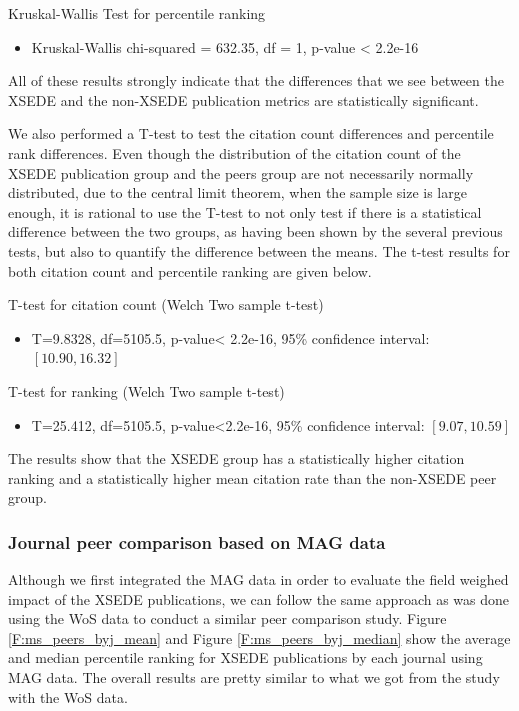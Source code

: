 \documentclass[sigconf]{acmart}
\begin{document}
Kruskal-Wallis Test for percentile ranking
\begin{itemize}
\item Kruskal-Wallis chi-squared = 632.35, df = 1, p-value < 2.2e-16
\end{itemize}

All of these results strongly indicate that the differences that we
see between the XSEDE and the non-XSEDE publication metrics are
statistically significant.

We also performed a T-test to test the citation count differences and
percentile rank differences. Even though the distribution of the
citation count of the XSEDE publication group and the peers group are
not necessarily normally distributed, due to the central limit
theorem, when the sample size is large enough, it is rational to use
the T-test to not only test if there is a statistical difference
between the two groups, as having been shown by the several previous
tests, but also to quantify the difference between the means. The
t-test results for both citation count and percentile ranking are
given below.

T-test for citation count (Welch Two sample t-test)
\begin{itemize}
\item T=9.8328, df=5105.5, p-value< 2.2e-16, 95\% confidence interval: $[10.90, 16.32]$
\end{itemize}

T-test for ranking (Welch Two sample t-test)
\begin{itemize}
\item T=25.412, df=5105.5, p-value<2.2e-16, 95\% confidence interval: $[9.07, 10.59]$
\end{itemize}


The results show that the XSEDE group has a statistically higher
citation ranking and a statistically higher mean citation rate than
the non-XSEDE peer group.

\subsubsection{Journal peer comparison based on MAG data}

Although we first integrated the MAG data in order to evaluate the
field weighed impact of the XSEDE publications, we can follow the same
approach as was done using the WoS data to conduct a similar peer
comparison study. Figure \ref{F:ms_peers_byj_mean} and Figure
\ref{F:ms_peers_byj_median} show the average and median percentile
ranking for XSEDE publications by each journal using MAG data. The
overall results are pretty similar to what we got from the study with
the WoS data.
\end{document}
